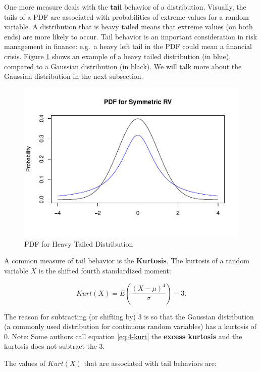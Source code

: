 \documentclass[
]{book}
\begin{document}
One more measure deals with the \textbf{tail} behavior of a distribution. Visually, the tails of a PDF are associated with probabilities of extreme values for a random variable. A distribution that is heavy tailed means that extreme values (on both ends) are more likely to occur. Tail behavior is an important consideration in risk management in finance: e.g.~a heavy left tail in the PDF could mean a financial crisis. Figure \ref{fig:4-kurt} shows an example of a heavy tailed distribution (in blue), compared to a Gaussian distribution (in black). We will talk more about the Gaussian distribution in the next subsection.

\begin{figure}
\centering
\includegraphics{bookdown-demo_files/figure-latex/4-kurt-1.pdf}
\caption{\label{fig:4-kurt}PDF for Heavy Tailed Distribution}
\end{figure}

A common measure of tail behavior is the \textbf{Kurtosis}. The kurtosis of a random variable \(X\) is the shifted fourth standardized moment:

\begin{equation} 
Kurt(X) = E \left(\frac{(X-\mu)^4}{\sigma} \right) - 3.
\label{eq:4-kurt}
\end{equation}

The reason for subtracting (or shifting by) 3 is so that the Gaussian distribution (a commonly used distribution for continuous random variables) has a kurtosis of 0. Note: Some authors call equation \eqref{eq:4-kurt} the \textbf{excess kurtosis} and the kurtosis does not subtract the 3.

The values of \(Kurt(X)\) that are associated with tail behaviors are:
\end{document}
